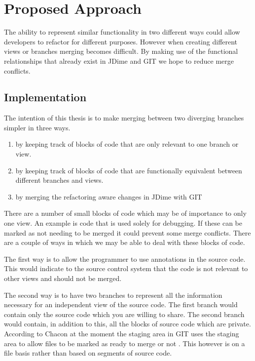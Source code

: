 \documentclass[12pt]{CRPITStyle}
\renewcommand{\cite}{\citep}
\begin{document}
\section{Proposed Approach}
The ability to represent similar functionality in two different ways could allow developers to refactor for different purposes. However when creating different views or branches merging becomes difficult. By making use of the functional relationships that already exist in JDime and GIT we hope to reduce merge conflicts. 

\subsection{Implementation}

The intention of this thesis is to make merging between two diverging branches simpler in three ways. 

\begin{enumerate}

 \item by keeping track of blocks of code that are only relevant to one branch or view.
 \item by keeping track of blocks of code that are functionally equivalent between different branches and views.
 \item by merging the refactoring aware changes in JDime with GIT

\end{enumerate}

There are a number of small blocks of code which may be of importance to only one view.  An example is code that is used solely for debugging. If these can be marked as not needing to be merged it could prevent some merge conflicts. There are a couple of ways in which we may be able to deal with these blocks of code.

The first way is to allow the programmer to use annotations in the source code. This would indicate to the source control system that the code is not relevant to other views and should not be merged.

The second way is to have two branches to represent all the information necessary for an independent view of the source code.  The first branch would contain only the source code which you are willing to share. The second branch would contain, in addition to this, all the blocks of source code which are private.  According to Chacon at the moment the staging area in GIT uses the staging area to allow files to be marked as ready to merge or not \cite{Chacon2009}. This however is on a file basis rather than based on segments of source code.
\end{document}
